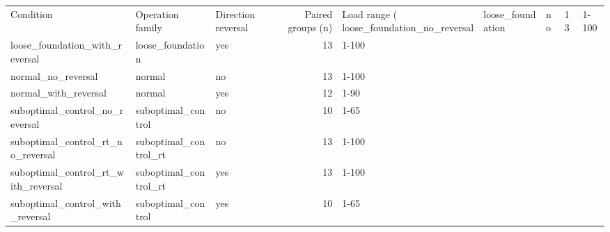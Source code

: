 \begin{tabular}{lllrl}
\toprule
Condition & Operation family & Direction reversal & Paired groups (n) & Load range (%
\midrule
loose_foundation_no_reversal & loose_foundation & no & 13 & 1-100 \\
loose_foundation_with_reversal & loose_foundation & yes & 13 & 1-100 \\
normal_no_reversal & normal & no & 13 & 1-100 \\
normal_with_reversal & normal & yes & 12 & 1-90 \\
suboptimal_control_no_reversal & suboptimal_control & no & 10 & 1-65 \\
suboptimal_control_rt_no_reversal & suboptimal_control_rt & no & 13 & 1-100 \\
suboptimal_control_rt_with_reversal & suboptimal_control_rt & yes & 13 & 1-100 \\
suboptimal_control_with_reversal & suboptimal_control & yes & 10 & 1-65 \\
\bottomrule
\end{tabular}
